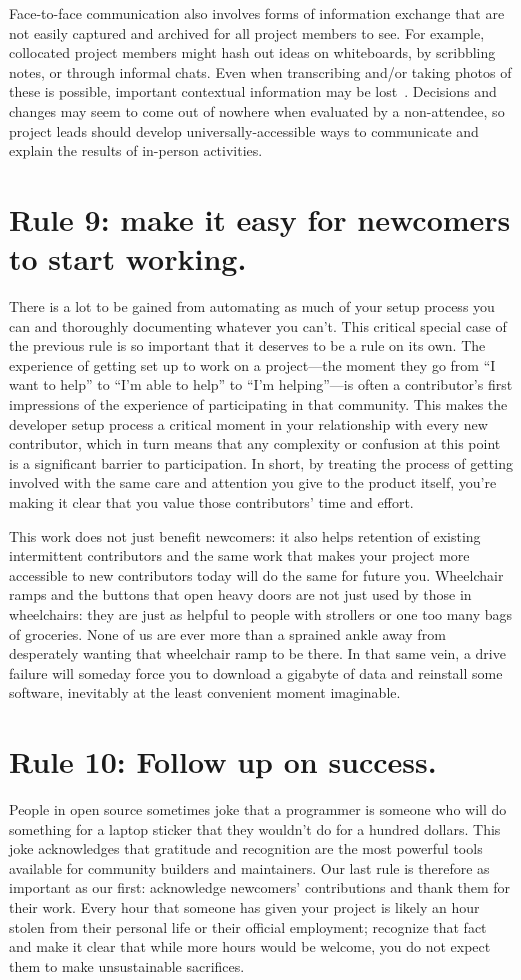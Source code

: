 \documentclass[10pt,letterpaper]{article}
\newcommand{\rulemajor}[1]{\section*{#1}}
\begin{document}
Face-to-face communication also involves forms of information exchange
that are not easily captured and archived for all project members to see.
For example,
collocated project members might hash out ideas on whiteboards,
by scribbling notes,
or through informal chats.
Even when transcribing and/or taking photos of these is possible,
important contextual information may be lost~\cite{cherubini2007}.
Decisions and changes may seem to come out of nowhere when evaluated by a non-attendee,
so project leads should develop universally-accessible ways to communicate and explain the results of in-person activities.

\rulemajor{Rule 9: make it easy for newcomers to start working.}

There is a lot to be gained from automating as much of your setup process you can
and thoroughly documenting whatever you can't.
This critical special case of the previous rule is so important that it deserves to be a rule on its own.
The experience of getting set up to work on a project---the moment they go from ``I want to help''
to ``I'm able to help'' to ``I'm helping''---is often a contributor's first impressions of
the experience of participating in that community.
This makes the developer setup process a critical moment in your relationship with every new contributor,
which in turn means that any complexity or confusion at this point is a significant barrier to participation.
In short, by treating the process of getting involved with the same care and attention you give
to the product itself, you're making it clear that you value those contributors' time and effort.

This work does not just benefit newcomers:
it also helps retention of existing intermittent contributors and the same work that makes your project more
accessible to new contributors today will do the same for future you.
Wheelchair ramps and the buttons that open heavy doors are not just used by those in wheelchairs:
they are just as helpful to people with strollers or one too many bags of groceries.
None of us are ever more than a sprained ankle away from desperately wanting that wheelchair ramp to be there.
In that same vein, a drive failure will someday force you to download a gigabyte of data
and reinstall some software, inevitably at the least convenient moment imaginable.

\rulemajor{Rule 10: Follow up on success.}

People in open source sometimes joke that
a programmer is someone who will do something for a laptop sticker
that they wouldn't do for a hundred dollars.
This joke acknowledges that gratitude and recognition are the most powerful tools available for community builders and maintainers.
Our last rule is therefore as important as our first:
acknowledge newcomers' contributions and thank them for their work.
Every hour that someone has given your project is likely an hour stolen from their personal life
or their official employment;
recognize that fact
and make it clear that while more hours would be welcome,
you do not expect them to make unsustainable sacrifices.
\end{document}

